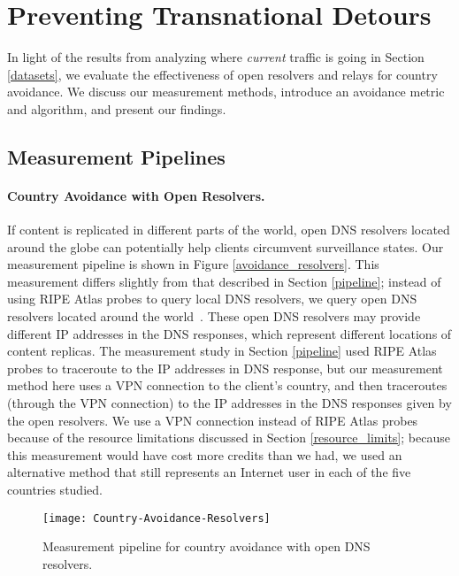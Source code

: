 \section{Preventing Transnational Detours}
\label{avoid_results}
In light of the results from analyzing where \textit{current} traffic is going in Section \ref{datasets}, we evaluate the effectiveness of open resolvers and relays for country avoidance.  We discuss our measurement methods, introduce an avoidance metric and algorithm, and present our findings.

\subsection{Measurement Pipelines}
\label{avoid_pipelines}

\paragraph{Country Avoidance with Open Resolvers.} If content is replicated in different parts of the world, open DNS resolvers located around the globe can potentially help clients circumvent surveillance states.  Our measurement pipeline is shown in Figure \ref{avoidance_resolvers}.  This measurement differs slightly from that described in Section \ref{pipeline}; instead of using RIPE Atlas probes to query local DNS resolvers, we query open DNS resolvers located around the world~\cite{open_resolver_list}.  These open DNS resolvers may provide different IP addresses in the DNS responses, which represent different locations of content replicas. The measurement study in Section \ref{pipeline} used RIPE Atlas probes to traceroute to the IP addresses in DNS response, but our measurement method here uses a VPN connection to the client's country, and then traceroutes (through the VPN connection) to the IP addresses in the DNS responses given by the open resolvers.  We use a VPN connection instead of RIPE Atlas probes because of the resource limitations discussed in Section \ref{resource_limits}; because this measurement would have cost more credits than we had, we used an alternative method that still represents an Internet user in each of the five countries studied.

\begin{figure}[t]
\centering
\texttt{[image: Country-Avoidance-Resolvers]}
\caption{Measurement pipeline for country avoidance with open DNS resolvers.}
\label{fig:avoidance_resolvers}
\end{figure}


